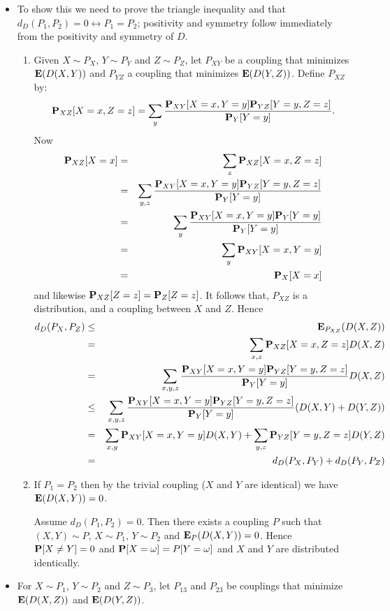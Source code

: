 \documentclass[11pt]{article} \usepackage{amssymb}
\newcommand{\E}{{\bf E}} \newcommand{\Cov}{{\bf Cov}}
\begin{document}
\begin{itemize}
\item To show this we need to prove the triangle inequality and that
  $d_D(P_1,P_2)=0 \leftrightarrow P_1=P_2$; positivity and symmetry follow immediately from
  the positivity and symmetry of $D$.
  \begin{enumerate}
  \item Given $X\sim P_X$, $Y\sim P_Y$ and $Z\sim P_Z$, let $P_{XY}$ be
    a coupling that minimizes $\E(D(X,Y))$ and $P_{YZ}$ a coupling that
    minimizes $\E(D(Y,Z))$. Define $P_{XZ}$ by:
    $$\P_{XZ}[X=x,Z=z]=\sum_y{\P_{XY}[X=x,Y=y]\P_{YZ}[Y=y,Z=z]\over \P_Y[Y=y]}.$$ 
    Now 
    \begin{eqnarray*}
      \P_{XZ}[X=x]&=&\sum_z\P_{XZ}[X=x,Z=z]
      \\ &=& \sum_{y,z}{\P_{XY}[X=x,Y=y]\P_{YZ}[Y=y,Z=z]\over \P_Y[Y=y]}
      \\ &=& \sum_{y}{\P_{XY}[X=x,Y=y]\P_{Y}[Y=y]\over \P_Y[Y=y]}
      \\ &=& \sum_{y}\P_{XY}[X=x,Y=y]
      \\ &=& \P_X[X=x]
    \end{eqnarray*}
    and likewise $\P_{XZ}[Z=z]=\P_Z[Z=z]$. It follows that, $P_{XZ}$ is a
    distribution, and a coupling between $X$ and $Z$. Hence 
    \begin{eqnarray*}
      d_D(P_X,P_Z)&\leq& \E_{P_{XZ}}(D(X,Z)) 
      \\ &=& \sum_{x,z}\P_{XZ}[X=x,Z=z]D(X,Z)
      \\ &=& \sum_{x,y,z}{\P_{XY}[X=x,Y=y]\P_{YZ}[Y=y,Z=z]\over \P_Y[Y=y]}D(X,Z)
      \\ &\leq&\sum_{x,y,z}{\P_{XY}[X=x,Y=y]\P_{YZ}[Y=y,Z=z]\over \P_Y[Y=y]}(D(X,Y)+D(Y,Z))
      \\ &=&\sum_{x,y}\P_{XY}[X=x,Y=y]D(X,Y)+\sum_{y,z}\P_{YZ}[Y=y,Z=z]D(Y,Z)
      \\ &=&d_D(P_X,P_Y)+d_D(P_Y,P_Z)
    \end{eqnarray*}
    
  \item If $P_1=P_2$ then by the trivial coupling ($X$ and $Y$ are identical)
    we have $\E(D(X,Y))=0$. 

    Assume $d_D(P_1,P_2)=0$. Then there exists a coupling $P$ such that  
    $(X,Y)\sim P$,
    $X\sim P_1$, $Y\sim P_2$ and $\E_P(D(X,Y))=0$. Hence $\P[X\neq Y]=0$ and
    $\P[X=\omega]=P[Y=\omega]$ and $X$ and $Y$ are distributed identically.
  \end{enumerate}
  \item 
    For  $X\sim P_1$, $Y\sim P_2$ and $Z\sim P_3$, let $P_{13}$ and $P_{23}$ 
    be couplings that minimize $\E(D(X,Z))$ and
    $\E(D(Y,Z))$.
    

\end{itemize}
\end{document}
